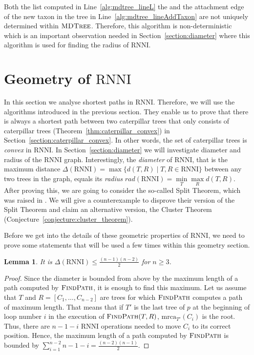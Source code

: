\documentclass{amsart}
\newcommand{\mrca}{\mathrm{mrca}}
\newcommand{\rnni}{\mathrm{RNNI}}
\newcommand{\findpath}{\textsc{FindPath}}
\newcommand{\mdtree}{\textsc{MDTree}}
\newtheorem{lemma}[definition]{Lemma}
\begin{document}
Both the list computed in Line~\ref{alg:mdtree_lineL} the and the attachment edge of the new taxon in the tree in Line~\ref{alg:mdtree_lineAddTaxon} are not uniquely determined within $\mdtree$.
Therefore, this algorithm is non-deterministic which is an important observation needed in Section~\ref{section:diameter} where this algorithm is used for finding the radius of $\rnni$.


\section{Geometry of $\rnni$}
\label{section:geometry}

In this section we analyse shortest paths in $\rnni$.
Therefore, we will use the algorithms introduced in the previous section.
They enable us to prove that there is always a shortest path between two caterpillar trees that only consists of caterpillar trees (Theorem~\ref{thm:caterpillar_convex}) in Section~\ref{section:caterpillar_convex}.
In other words, the set of caterpillar trees is \emph{convex} in $\rnni$.
In Section~\ref{section:diameter} we will investigate diameter and radius of the $\rnni$ graph.
Interestingly, the \emph{diameter} of $\rnni$, that is the maximum distance $\Delta(\rnni) = \max \{d(T, R) \mid T, R \in \rnni\}$ between any two trees in the graph, equals its \emph{radius} $rad(\rnni) = \min\limits_T \max\limits_R d(T,R)$.
After proving this, we are going to consider the so-called Split Theorem, which was raised in \autocite{Gavryushkin2018-ol}.
We will give a counterexample to disprove their version of the Split Theorem and claim an alternative version, the Cluster Theorem (Conjecture~\ref{conjecture:cluster_theorem}).

Before we get into the details of these geometric properties of $\rnni$, we need to prove some statements that will be used a few times within this geometry section.

\begin{lemma}
It is $\Delta(\rnni) \leq \frac{(n-1)(n-2)}{2}$ for $n \geq 3$.
\label{lemma:diameter_bound}
\end{lemma}

\begin{proof}
Since the diameter is bounded from above by the maximum length of a path computed by $\findpath$, it is enough to find this maximum.
Let us assume that $T$ and $R = [C_1, \ldots, C_{n-2}]$ are trees for which $\findpath$ computes a path of maximum length.
That means that if $T'$ is the last tree of $p$ at the beginning of loop number $i$ in the execution of $\findpath(T,R)$, $\mrca_{T'}(C_i)$ is the root.
Thus, there are $n-1-i$ $\rnni$ operations needed to move $C_i$ to its correct position.
Hence, the maximum length of a path computed by $\findpath$ is bounded by $\sum\limits_{i = 1}^{n-2} n-1-i = \frac{(n-2)(n-1)}{2}$.
\end{proof}
\end{document}
